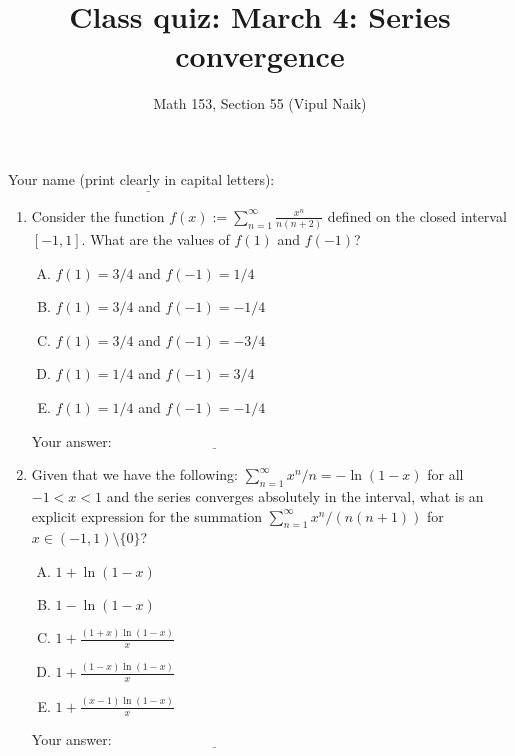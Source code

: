 \documentclass[10pt]{amsart}
\title{Class quiz: March 4: Series convergence}
\author{Math 153, Section 55 (Vipul Naik)}
\begin{document}
\maketitle

Your name (print clearly in capital letters): $\underline{\qquad\qquad\qquad\qquad\qquad\qquad\qquad\qquad\qquad\qquad}$

\begin{enumerate}


\item Consider the function $f(x) := \sum_{n=1}^\infty
  \frac{x^n}{n(n + 2)}$ defined on the closed interval
  $[-1,1]$. What are the values of $f(1)$ and $f(-1)$?

  \begin{enumerate}[(A)]
  \item $f(1) = 3/4$ and $f(-1) = 1/4$
  \item $f(1) = 3/4$ and $f(-1) = -1/4$
  \item $f(1) = 3/4$ and $f(-1) = -3/4$
  \item $f(1) = 1/4$ and $f(-1) = 3/4$
  \item $f(1) = 1/4$ and $f(-1) = -1/4$
  \end{enumerate}

  \vspace{0.1in}
  Your answer: $\underline{\qquad\qquad\qquad\qquad\qquad\qquad\qquad}$
  \vspace{0.15in}

\item Given that we have the following: $\sum_{n=1}^\infty x^n/n =
  -\ln(1 - x)$ for all $-1 < x < 1$ and the series converges
  absolutely in the interval, what is an explicit expression for the
  summation $\sum_{n=1}^\infty x^n/(n(n+1))$ for $x \in (-1,1)
  \setminus \{ 0 \}$?

  \begin{enumerate}[(A)]
  \item $1 + \ln(1 - x)$
  \item $1 - \ln(1 - x)$
  \item $1 + \frac{(1 + x)\ln(1 - x)}{x}$
  \item $1 + \frac{(1 - x)\ln(1 - x)}{x}$
  \item $1 + \frac{(x - 1)\ln(1 - x)}{x}$
  \end{enumerate}

  \vspace{0.1in}
  Your answer: $\underline{\qquad\qquad\qquad\qquad\qquad\qquad\qquad}$
  \vspace{0.15in}


\end{enumerate}
\end{document}
